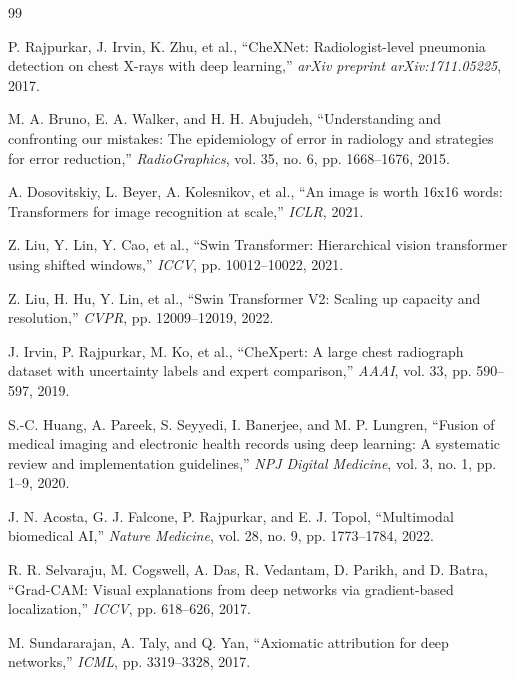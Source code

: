 \documentclass[12pt,a4paper]{report}
\begin{document}
\begin{thebibliography}{99}

P. Rajpurkar, J. Irvin, K. Zhu, et al., ``CheXNet: Radiologist-level pneumonia detection on chest X-rays with deep learning,'' \textit{arXiv preprint arXiv:1711.05225}, 2017.

M. A. Bruno, E. A. Walker, and H. H. Abujudeh, ``Understanding and confronting our mistakes: The epidemiology of error in radiology and strategies for error reduction,'' \textit{RadioGraphics}, vol. 35, no. 6, pp. 1668--1676, 2015.

A. Dosovitskiy, L. Beyer, A. Kolesnikov, et al., ``An image is worth 16x16 words: Transformers for image recognition at scale,'' \textit{ICLR}, 2021.

Z. Liu, Y. Lin, Y. Cao, et al., ``Swin Transformer: Hierarchical vision transformer using shifted windows,'' \textit{ICCV}, pp. 10012--10022, 2021.

Z. Liu, H. Hu, Y. Lin, et al., ``Swin Transformer V2: Scaling up capacity and resolution,'' \textit{CVPR}, pp. 12009--12019, 2022.

J. Irvin, P. Rajpurkar, M. Ko, et al., ``CheXpert: A large chest radiograph dataset with uncertainty labels and expert comparison,'' \textit{AAAI}, vol. 33, pp. 590--597, 2019.

S.-C. Huang, A. Pareek, S. Seyyedi, I. Banerjee, and M. P. Lungren, ``Fusion of medical imaging and electronic health records using deep learning: A systematic review and implementation guidelines,'' \textit{NPJ Digital Medicine}, vol. 3, no. 1, pp. 1--9, 2020.

J. N. Acosta, G. J. Falcone, P. Rajpurkar, and E. J. Topol, ``Multimodal biomedical AI,'' \textit{Nature Medicine}, vol. 28, no. 9, pp. 1773--1784, 2022.

R. R. Selvaraju, M. Cogswell, A. Das, R. Vedantam, D. Parikh, and D. Batra, ``Grad-CAM: Visual explanations from deep networks via gradient-based localization,'' \textit{ICCV}, pp. 618--626, 2017.

M. Sundararajan, A. Taly, and Q. Yan, ``Axiomatic attribution for deep networks,'' \textit{ICML}, pp. 3319--3328, 2017.


\end{thebibliography}
\end{document}
